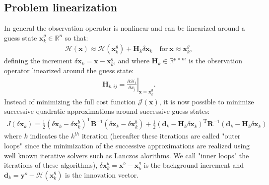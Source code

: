 \documentclass[npg, manuscript]{copernicus}
\begin{document}
\subsection{Problem linearization}
In general the observation operator is nonlinear and can be linearized around a guess state $\mathbf{x}^g_k \in \mathbb{R}^n$ so that: 
\begin{align}
 \mathcal{H}(\mathbf{x}) \approx \mathcal{H}(\mathbf{x}^g_k) + \mathbf{H}_k \delta \mathbf{x}_k \quad \textrm{for}\ \mathbf{x} \approx \mathbf{x}^g_k,
\end{align}
defining the increment $\delta \mathbf{x}_k =  \mathbf{x}-\mathbf{x}^g_k$, and where $\mathbf{H}_k \in \mathbb{R}^{p \times m}$ is the observation operator linearized around the guess state: 
\begin{align}
 \mathbf{H}_{k,ij} = \left.\frac{\partial \mathcal{H}_i}{\partial x_j}\right|_{\mathbf{x} = \mathbf{x}^g_k}.
\end{align}
Instead of minimizing the full cost function $\mathcal{J}(\mathbf{x})$, it is now possible to minimize successive quadratic approximations around successive guess states:
\begin{align}
\label{eq:cost_quad}
J \left(\delta \mathbf{x}_k\right) = \frac{1}{2} \left(\delta \mathbf{x}_k-\delta \mathbf{x}^b_k\right)^\mathrm{T} \mathbf{B}^{-1} \left(\delta \mathbf{x}_k-\delta \mathbf{x}^b_k\right) + \frac{1}{2} \left(\mathbf{d}_k - \mathbf{H}_k \delta \mathbf{x}_k\right)^\mathrm{T} \mathbf{R}^{-1} \left(\mathbf{d}_k - \mathbf{H}_k \delta \mathbf{x}_k\right)
\end{align}
where $k$ indicates the $k^{th}$ iteration (hereafter these iterations are called "outer loops" since the minimization of the successive approximations are realized using well known iterative solvers such as Lanczos alorithms. We call "inner loops" the iterations of these algorithms), $\delta \mathbf{x}^b_k = \mathbf{x}^b - \mathbf{x}^g_k$ is the background increment and $\mathbf{d}_k = \mathbf{y}^o - \mathcal{H}(\mathbf{x}^g_k)$ is the innovation vector.\\
\end{document}
